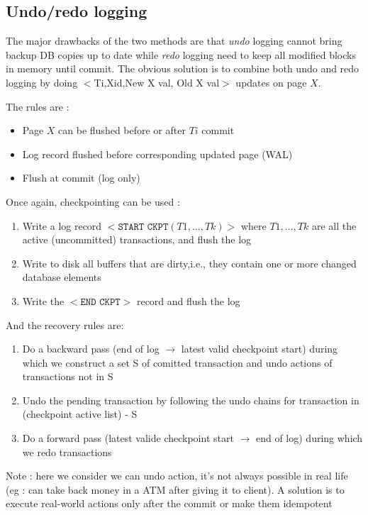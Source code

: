 \documentclass[12pt,a4paper]{article}
\begin{document}
\subsection{Undo/redo logging}
The major drawbacks of the two methods are that \textit{undo} logging cannot bring backup DB copies up to date while \textit{redo} logging need to keep all modified blocks in memory until commit. The obvious solution is to combine both undo and redo logging by doing $<$Ti,Xid,New X val, Old X val$>$ updates on page $X$.

The rules are :
\begin{itemize}
\item Page $X$ can be flushed before or after $Ti$ commit
\item Log record flushed before corresponding updated page (WAL)
\item Flush at commit (log only)
\end{itemize}

Once again, checkpointing can be used :
\begin{enumerate}
\item Write a log record $<\texttt{START CKPT} (T1,...,Tk)>$ where $T1,...,Tk$ are all the active (uncommitted) transactions, and flush the log
\item Write to disk all buffers that are dirty,i.e., they contain one or more changed database elements
\item Write the $<\texttt{END CKPT}>$ record and flush the log
\end{enumerate}

And the recovery rules are:
\begin{enumerate}
\item Do a backward pass (end of log $\rightarrow$ latest valid checkpoint start) during which we construct a set S of comitted transaction and undo actions of transactions not in S
\item Undo the pending transaction by following the undo chains for transaction in (checkpoint active list) - S
\item Do a forward pass (latest valide checkpoint start $\rightarrow$ end of log) during which we redo transactions
\end{enumerate}

Note : here we consider we can undo action, it's not always possible in real life (eg : can take back money in a ATM after giving it to client). A solution is to execute real-world actions only after the commit or make them idempotent
\end{document}
